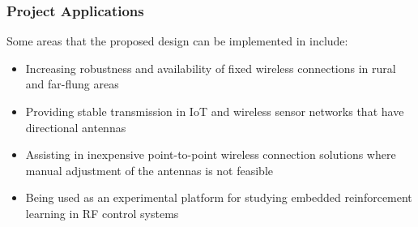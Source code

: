 \subsubsection{Project Applications}

Some areas that the proposed design can be implemented in include:
\begin{itemize}
    \item Increasing robustness and availability of fixed wireless connections in rural and far-flung areas 
    \item Providing stable transmission in IoT and wireless sensor networks that have directional antennas 
    \item Assisting in inexpensive point-to-point wireless connection solutions where manual adjustment of the antennas is not feasible 
    \item Being used as an experimental platform for studying embedded reinforcement learning in RF control systems 
\end{itemize}
